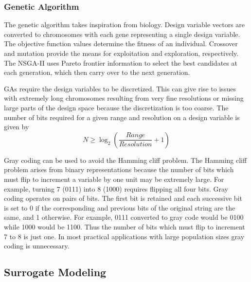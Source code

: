 \documentclass[12pt]{article}
\begin{document}
\subsubsection{Genetic Algorithm}
The genetic algorithm takes inspiration from biology. Design variable vectors are converted to chromosomes with each gene representing a single design variable. The objective function values determine the fitness of an individual. Crossover and mutation provide the means for exploitation and exploration, respectively. The NSGA-II uses Pareto frontier information to select the best candidates at each generation, which then carry over to the next generation.

GAs require the design variables to be discretized. This can give rise to issues with extremely long chromosomes resulting from very fine resolutions or missing large parts of the design space because the discretization is too coarse. The number of bits required for a given range and resolution on a design variable is given by
$$N\geq\log_2\left(\frac{Range}{Resolution}+1\right)$$

Gray coding can be used to avoid the Hamming cliff problem. The Hamming cliff problem arises from binary representations because the number of bits which must flip to increment a variable by one unit may be extremely large. For example, turning 7 (0111) into 8 (1000) requires flipping all four bits. Gray coding operates on pairs of bits. The first bit is retained and each successive bit is set to 0 if the corresponding and previous bits of the original string are the same, and 1 otherwise. For example, 0111 converted to gray code would be 0100 while 1000 would be 1100. Thus the number of bits which must flip to increment 7 to 8 is just one. In most practical applications with large population sizes gray coding is unnecessary.

\subsection{Surrogate Modeling}
\end{document}
